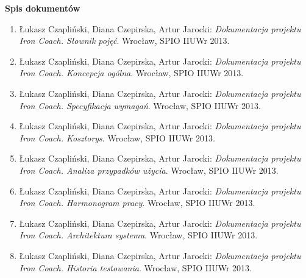 


\newcommand{\quickbib}[1]{\item Łukasz Czapliński, Diana Czepirska, Artur Jarocki: {\it Dokumentacja projektu Iron Coach. #1}. Wrocław, SPIO IIUWr 2013.}

\vspace*{1cm}
{\textbf{\large{Spis dokumentów}}}\vspace{0.5cm}
\begin{enumerate}\itemsep5pt
      \quickbib{Słownik pojęć}
      \quickbib{Koncepcja ogólna}
      \quickbib{Specyfikacja wymagań}
      \quickbib{Kosztorys}
      \quickbib{Analiza przypadków użycia}
      \quickbib{Harmonogram pracy}
      \quickbib{Architektura systemu}
      \quickbib{Historia testowania}
\end{enumerate}
\vfill


